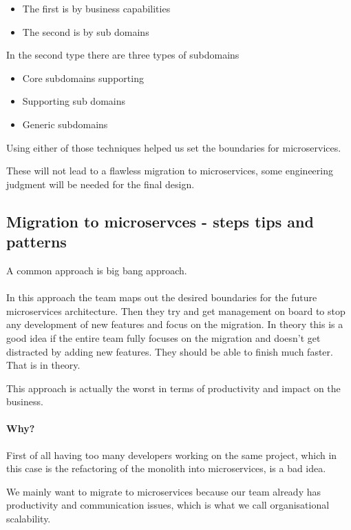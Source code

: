 \begin{itemize}
    \item The first is by business capabilities
    \item The second is by sub domains
\end{itemize}
In the second type there are three types of subdomains
\begin{itemize}
    \item Core subdomains supporting
    \item Supporting sub domains
    \item Generic subdomains
\end{itemize}

Using either of those techniques helped us set the boundaries for microservices.

These will not lead to a flawless migration to microservices, some engineering judgment will be needed for the final design.

\subsection{Migration to microservces - steps tips and patterns}
A common approach is big bang approach.

\paragraph{}
In this approach the team maps out the desired boundaries for the future microservices architecture.
Then they try and get management on board to stop any development of new features and focus on the migration.
In theory this is a good idea if the entire team fully focuses on the migration and doesn't get distracted by adding new features.
They should be able to finish much faster.
That is in theory.
\begin{note}
    This approach is actually the worst in terms of productivity and impact on the business.
\end{note}

\paragraph{Why?}
First of all having too many developers working on the same project, which in this case is the refactoring of the monolith into microservices, is a bad idea.

\begin{note}
    We mainly want to migrate to microservices because our team already has productivity and communication issues, which is what we call organisational scalability.
\end{note}

